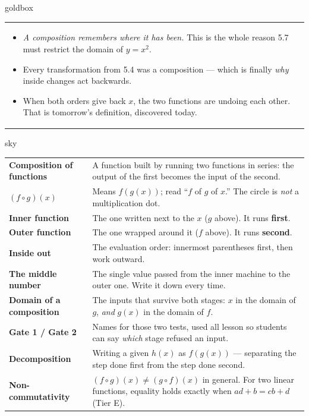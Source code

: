 \documentclass[10pt]{article}
\begin{document}
\begin{skillbox}{goldbox}
\begin{tabularx}{\linewidth}{@{}X|X@{}}
\begin{itemize}[leftmargin=1.1em, nosep, after=\vspace{2pt}]
  \item \emph{A composition remembers where it has been.} This is the whole reason 5.7 must restrict the domain of $y=x^{2}$.
  \item Every transformation from 5.4 was a composition --- which is finally \emph{why} inside changes act backwards.
  \item When both orders give back $x$, the two functions are undoing each other. That is tomorrow's definition, discovered today.
\end{itemize}
\end{tabularx}
\end{skillbox}

\begin{skillbox}{sky}
\renewcommand{\arraystretch}{1.3}
\begin{tabularx}{\linewidth}{@{}l X@{}}
\textbf{Composition of functions} & A function built by running two functions in series: the output of the first becomes the input of the second. \\
\textbf{$(f\circ g)(x)$} & Means $f(g(x))$; read ``$f$ of $g$ of $x$.'' The circle is \emph{not} a multiplication dot. \\
\textbf{Inner function} & The one written next to the $x$ ($g$ above). It runs \textbf{first}. \\
\textbf{Outer function} & The one wrapped around it ($f$ above). It runs \textbf{second}. \\
\textbf{Inside out} & The evaluation order: innermost parentheses first, then work outward. \\
\textbf{The middle number} & The single value passed from the inner machine to the outer one. Write it down every time. \\
\textbf{Domain of a composition} & The inputs that survive both stages: $x$ in the domain of $g$, \emph{and} $g(x)$ in the domain of $f$. \\
\textbf{Gate 1 / Gate 2} & Names for those two tests, used all lesson so students can say \emph{which} stage refused an input. \\
\textbf{Decomposition} & Writing a given $h(x)$ as $f(g(x))$ --- separating the step done first from the step done second. \\
\textbf{Non-commutativity} & $(f\circ g)(x)\ne(g\circ f)(x)$ in general. For two linear functions, equality holds exactly when $ad+b=cb+d$ (Tier E). \\
\end{tabularx}
\end{skillbox}
\end{document}
